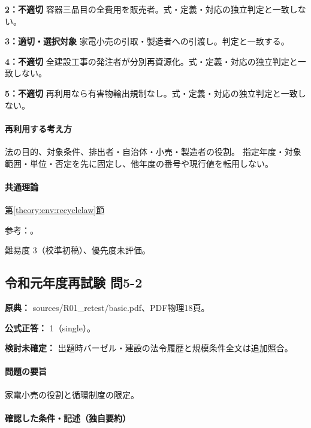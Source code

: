 \noindent\textbf{2：不適切} 容器三品目の全費用を販売者。式・定義・対応の独立判定と一致しない。\par

\noindent\textbf{3：適切・選択対象} 家電小売の引取・製造者への引渡し。判定と一致する。\par

\noindent\textbf{4：不適切} 全建設工事の発注者が分別再資源化。式・定義・対応の独立判定と一致しない。\par

\noindent\textbf{5：不適切} 再利用なら有害物輸出規制なし。式・定義・対応の独立判定と一致しない。\par

\paragraph{再利用する考え方} 法の目的、対象条件、排出者・自治体・小売・製造者の役割。 指定年度・対象範囲・単位・否定を先に固定し、他年度の番号や現行値を転用しない。

\paragraph{共通理論} \hyperref[theory:env:recyclelaw]{第\ref*{theory:env:recyclelaw}節}

\par 参考：\cite{env_circular_law,env_appliance}。

\par 難易度 3（校準初稿）、優先度未評価。

\subsection{令和元年度再試験 問5-2}
\label{q:r01-ret-basic-5-2}

\noindent\textbf{原典：} sources/R01\_retest/basic.pdf、PDF物理18頁。

\textbf{公式正答：} 1（single）。

\par\textbf{検討未確定：} 出題時バーゼル・建設の法令履歴と規模条件全文は追加照合。

\paragraph{問題の要旨} 家電小売の役割と循環制度の限定。

\paragraph{確認した条件・記述（独自要約）}\mbox{}\par

